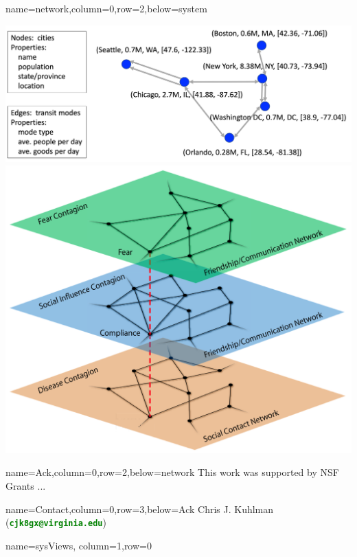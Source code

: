 \documentclass[landscape,a0paper,fontscale=0.285]{baposter} %
\begin{document}
\begin{poster}
{}

          {name=network,column=0,row=2,below=system}{
\includegraphics[scale=0.2]{figures/single_net.png}
\includegraphics[scale=0.3]{figures/multi_net.png}

}

          {name=Ack,column=0,row=2,below=network}{
{\footnotesize
This work was supported by NSF
Grants ...
}
}

          {name=Contact,column=0,row=3,below=Ack}{
{\footnotesize
{Chris J. Kuhlman~ (\textcolor{green}{\textbf{\texttt{cjk8gx@virginia.edu}}})}
}}


          {name=sysViews, column=1,row=0}{

}
\end{poster}
\end{document}
